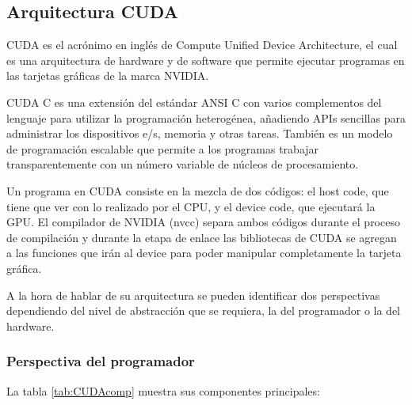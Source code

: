     \subsection{Arquitectura CUDA}
    CUDA es el acrónimo en inglés de Compute Unified Device Architecture, el cual es una arquitectura de hardware y de software que permite ejecutar programas en las tarjetas gráficas de la marca NVIDIA\cite{CUDAP}.
    \newline
   
    CUDA C es una extensión del estándar ANSI C con varios complementos del lenguaje para utilizar la programación heterogénea, añadiendo APIs sencillas para administrar los dispositivos e/s, memoria y otras tareas. También es un modelo de programación escalable que permite a los programas trabajar transparentemente con un número variable de núcleos de procesamiento.
    \newline
    
    Un programa en CUDA consiste en la mezcla de dos códigos: el host code, que tiene que ver con lo realizado por el CPU, y el device code, que ejecutará la GPU. El compilador de NVIDIA (nvcc) separa ambos códigos durante el proceso de compilación y durante la etapa de enlace las bibliotecas de CUDA se agregan a las funciones que irán al device para poder manipular completamente la tarjeta gráfica.
    \newline
    
    A la hora de hablar de su arquitectura se pueden identificar dos perspectivas dependiendo del nivel de abstracción que se requiera, la del programador o la del hardware.
        
  \subsubsection{Perspectiva del programador}
   
    La tabla \ref{tab:CUDAcomp} muestra sus componentes principales: 
    
